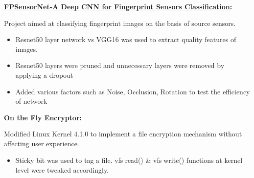 \documentclass[11pt, a4paper]{article}
\newcommand{\resumeNewItem}[3]{
  \item\small{
    \textbf{#1:}{\hfill \vspace{3pt}{#2}\\}{ #3\vspace{-5pt}}
  }
}
\newcommand{\resumeNewSubItem}[3]{\resumeNewItem{#1}{#2}{#3}\vspace{-8pt}}
\begin{document}
    \resumeNewSubItem{\href{https://github.com/deepakks1995/Fingerprint_Sensor_Classification}{FPSensorNet-A Deep CNN for Fingerprint Sensors Classification}}{(Mar 2017 - May 2017), IIT Mandi}{
        Project aimed at classifying fingerprint images on the basis of source sensors.
        \begin{itemize} 
            \vspace{-6pt}
          \item Resnet50 layer network vs VGG16 was used to extract quality features of images.
          \vspace{-3pt}
          \item Resnet50 layers were pruned and unnecessary layers were removed by applying a dropout 
          \vspace{-3pt}
          \item Added various factors such as Noise, Occlusion, Rotation to test the efficiency of network
        \end{itemize}
        
    }
    \vspace{6pt}
    \resumeNewSubItem{On the Fly Encryptor}{ VI Semester, IIT Mandi}{
        Modified Linux Kernel 4.1.0 to implement a file encryption mechanism without affecting user experience. 
        \begin{itemize} 
            \vspace{-6pt}
          \item Sticky bit was used to tag a file. vfs$_{\_}$read() \& vfs$_{\_}$write() functions  at kernel level were tweaked accordingly.
           \end{itemize}
       
    }
    \vspace{6pt}
\end{document}
